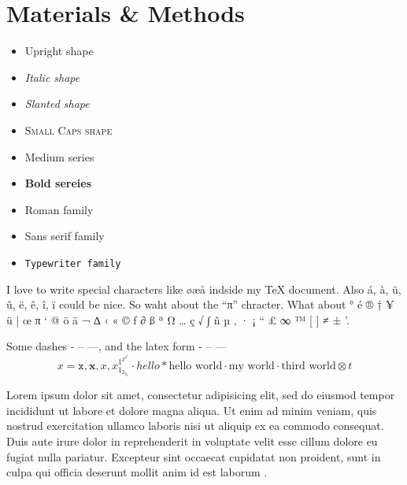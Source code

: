 \chapter{Materials \& Methods}
\label{chp:materialsmethods}

\begin{itemize}
    \item \textup{Upright shape}
    \item \textit{Italic shape}
    \item \textsl{Slanted shape}
    \item \textsc{Small Caps shape}
    \item \textmd{Medium series}
    \item \textbf{Bold sereies}
    \item \textrm{Roman family}
    \item \textsf{Sans serif family}
    \item \texttt{Typewriter family}
\end{itemize}

I love to write special characters like øæå indside my \TeX{} document. Also á, à, ü, û, ë, ê, î, ï could be nice. So waht about the ``π'' chracter. What about ° é ® † ¥ ü | œ π ‘ @ ö ä ¬ ∆ ‹ « © ƒ ∂ ß ª Ω … ç √ ∫ ñ µ ‚ · ¡ “ £ ∞ ™ [ ] ≠ ± '.

Some dashes - – —, and the latex form - -- ---
\begin{equation*}
    x = \mathtt{x}, \mathbf{x}, \mathit{x}, x_{1_{2_{3_{4}}}}^{1^{2^{3^{4}}}} \cdot hello * \text{hello world} ⋅ \text{my world} · \text{third world} ⊗ t
\end{equation*}

Lorem ipsum dolor sit amet, consectetur adipisicing elit, sed do eiusmod tempor incididunt ut labore et dolore magna aliqua. Ut enim ad minim veniam, quis nostrud exercitation ullamco laboris nisi ut aliquip ex ea commodo consequat. Duis aute irure dolor in reprehenderit in voluptate velit esse cillum dolore eu fugiat nulla pariatur. Excepteur sint occaecat cupidatat non proident, sunt in culpa qui officia deserunt mollit anim id est laborum \cite{adams1980hitchhiker}.

